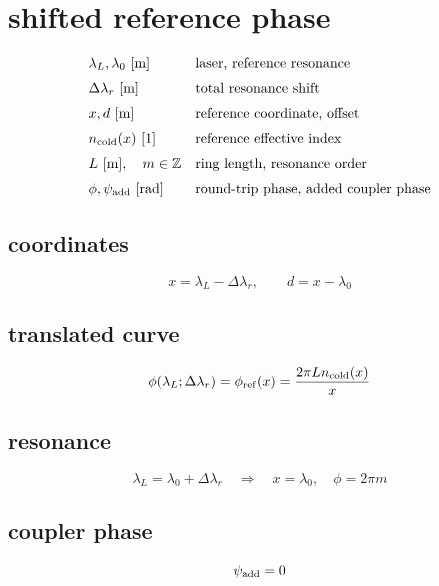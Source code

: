 \section*{shifted reference phase}
\[
\begin{array}{ll}\lambda_L,\lambda_0\ [\mathrm m]&\text{laser, reference resonance}\\[0.6em]\Delta\lambda_r\ [\mathrm m]&\text{total resonance shift}\\[0.6em]x,d\ [\mathrm m]&\text{reference coordinate, offset}\\[0.6em]n_{\rm cold}(x)\ [1]&\text{reference effective index}\\[0.6em]L\ [\mathrm m],\quad m\in\mathbb Z&\text{ring length, resonance order}\\[0.6em]\phi,\psi_{\rm add}\ [\mathrm{rad}]&\text{round-trip phase, added coupler phase}\end{array}
\]
\subsection*{coordinates}
\[
\displaystyle x=\lambda_L-\Delta\lambda_r,\qquad d=x-\lambda_0
\]
\subsection*{translated curve}
\[
\displaystyle \phi(\lambda_L;\Delta\lambda_r)=\phi_{\rm ref}(x)=\frac{2\pi L n_{\rm cold}(x)}{x}
\]
\subsection*{resonance}
\[
\displaystyle \lambda_L=\lambda_0+\Delta\lambda_r\quad\Longrightarrow\quad x=\lambda_0,\quad\phi=2\pi m
\]
\subsection*{coupler phase}
\[
\displaystyle \psi_{\rm add}=0
\]
